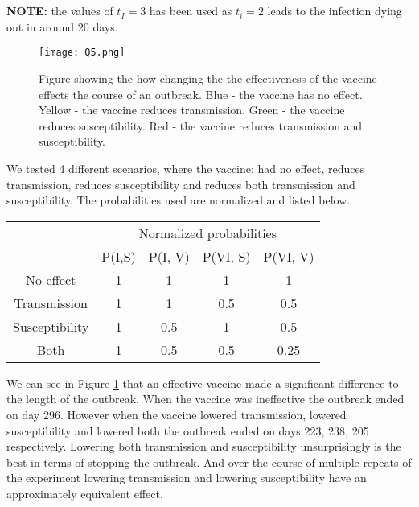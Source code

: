 \section{}
\textbf{NOTE: } the values of $t_I=3$ has been used as $t_i=2$ leads to the infection dying out in around 20 days.


\begin{figure}[h!]
    \begin{center}
        \texttt{[image: Q5.png]}
        \caption{Figure showing the how changing the the effectiveness of the vaccine effects the course of an outbreak. Blue - the vaccine has no effect. Yellow - the vaccine reduces transmission. Green - the vaccine reduces susceptibility. Red - the vaccine reduces transmission and susceptibility.} 
        \label{fig:q5}
    \end{center}
\end{figure}
We tested 4 different scenarios, where the vaccine: had no effect, reduces transmission, reduces susceptibility and reduces both transmission and susceptibility.
The probabilities used are normalized and listed below.
\begin{center}
\begin{tabular}{ccccc}
    &\multicolumn{4}{c}{Normalized probabilities}\\
    & P(I,S) & P(I, V) & P(VI, S) & P(VI, V)\\
    \hline
    No effect & 1 & 1& 1& 1 \\
    Transmission & 1 & 1& 0.5& 0.5 \\
    Susceptibility& 1 & 0.5& 1& 0.5 \\
    Both & 1 & 0.5 & 0.5 & 0.25 \\
\end{tabular}
\end{center}

We can see in Figure \ref{fig:q5} that an effective vaccine made a significant difference to the length of the outbreak.
When the vaccine was ineffective the outbreak ended on day 296.
However when the vaccine lowered transmission, lowered susceptibility and lowered both the outbreak ended on days 223, 238, 205 respectively.
Lowering both transmission and susceptibility unsurprisingly is the best in terms of stopping the outbreak.
And over the course of multiple repeats of the experiment lowering transmission and lowering susceptibility have an approximately equivalent effect.